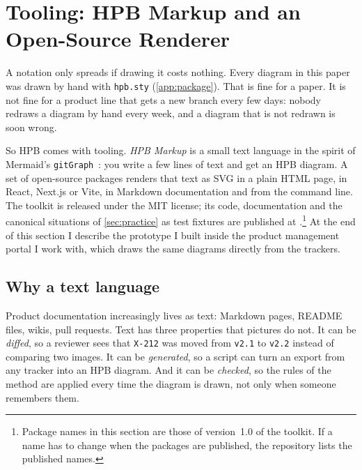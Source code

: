 \section{Tooling: HPB Markup and an Open-Source Renderer}
\label{sec:tooling}


A notation only spreads if drawing it costs nothing. Every diagram in this
paper was drawn by hand with \texttt{hpb.sty} (\cref{app:package}). That is
fine for a paper. It is not fine for a product line that gets a new branch
every few days: nobody redraws a diagram by hand every week, and a diagram
that is not redrawn is soon wrong.

So HPB comes with tooling. \emph{HPB Markup} is a small text language in
the spirit of Mermaid's \texttt{gitGraph}~\citep{mermaid}: you write a few
lines of text and get an HPB diagram. A set of open-source packages renders
that text as SVG in a plain HTML page, in React, Next.js or Vite, in
Markdown documentation and from the command line. The toolkit is released
under the MIT license; its code, documentation and the canonical
situations of \cref{sec:practice} as test fixtures are published at
\hpbrepo.\footnote{Package names in this section are those of version~1.0
of the toolkit. If a name has to change when the packages are published,
the repository lists the published names.} At the end of this section I
describe the prototype I built inside the product management portal I
work with, which draws the same diagrams directly from the trackers.

\subsection{Why a text language}
\label{sec:tooling-why}

Product documentation increasingly lives as text: Markdown pages, README
files, wikis, pull requests. Text has three properties that pictures do not.
It can be \emph{diffed}, so a reviewer sees that \texttt{X-212} was moved
from \texttt{v2.1} to \texttt{v2.2} instead of comparing two images. It can
be \emph{generated}, so a script can turn an export from any tracker into an
HPB diagram. And it can be \emph{checked}, so the rules of the method are
applied every time the diagram is drawn, not only when someone remembers
them.

